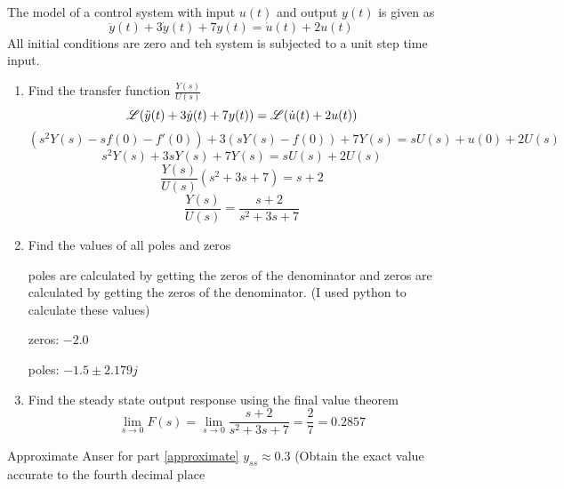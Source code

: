 
\item The model of a control system with input $u(t)$ and output $y(t)$ is given as
  \begin{equation}
    \ddot y(t) + 3\dot y(t) + 7y(t) = \dot u(t) + 2u(t)
  \end{equation}
  All initial conditions are zero and teh system is subjected to a unit step time input.
  \begin{enumerate}
  \item Find the transfer function $\frac{Y(s)}{U(s)}$\\
    \begin{equation}
      \mathscr{L}(\ddot y(t) + 3\dot y(t) + 7y(t)) = \mathscr{L}(\dot u(t) + 2u(t))
    \end{equation}
    \begin{equation}
      (s^2Y(s) -sf(0) - f'(0)) + 3(sY(s) - f(0)) + 7Y(s)= sU(s) + u(0)+ 2U(s)
    \end{equation}
    \begin{equation}
      s^2Y(s) + 3sY(s) + 7Y(s)= sU(s) + 2U(s)
    \end{equation}
    \begin{equation}
      \frac{Y(s)}{U(s)}(s^2 + 3s + 7) = s + 2
    \end{equation}
    \begin{equation}
      \frac{Y(s)}{U(s)} = \frac{s + 2}{s^2 + 3s + 7}
    \end{equation}
  \item Find the values of all poles and zeros
    
    poles are calculated by getting the zeros of the denominator and zeros are calculated by getting the zeros
    of the denominator. (I used python to calculate these values)
    
    zeros: $-2.0$
    
    poles: $-1.5 \pm 2.179j$
  \item Find the steady state output response using the final value theorem\label{approximate}
    \begin{equation}
      \lim_{s \to 0}F(s) = \lim_{s \to 0}\frac{s + 2}{s^2 + 3s + 7} = \frac 2 7 = 0.2857
    \end{equation}
  \end{enumerate}
  Approximate Anser for part \ref{approximate} $y_{ss} \approx 0.3$ (Obtain the exact value accurate to the fourth
  decimal place
